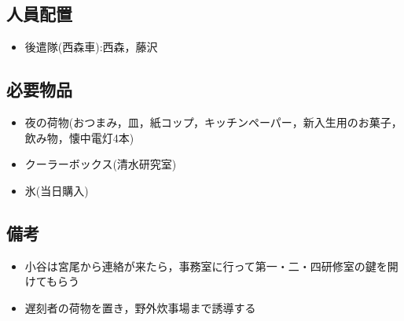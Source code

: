 \subsection{人員配置}
\begin{itemize}
\item 後遣隊(西森車):西森，藤沢
\end{itemize}

\subsection{必要物品}
\begin{itemize}
  \item 夜の荷物(おつまみ，皿，紙コップ，キッチンペーパー，新入生用のお菓子，飲み物，懐中電灯4本)
    \item クーラーボックス(清水研究室)
    \item 氷(当日購入)
\end{itemize}

\subsection{備考}
\begin{itemize}
\item 小谷は宮尾から連絡が来たら，事務室に行って第一・二・四研修室の鍵を開けてもらう
\item 遅刻者の荷物を置き，野外炊事場まで誘導する
\end{itemize}

%
